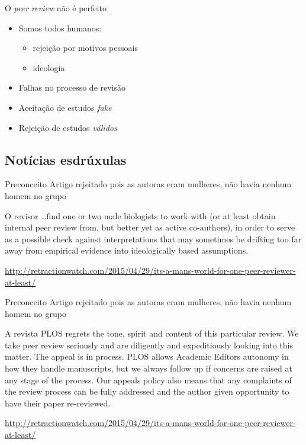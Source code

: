 \documentclass{beamer}
\begin{document}
\begin{frame}{O {\em peer review} não é perfeito}
  \begin{itemize}
    \footnotesize
  \item Somos todos humanos:
    \begin{itemize}
      \scriptsize
    \item rejeição por motivos pessoais
    \item ideologia
    \end{itemize}
    \medskip
  \item Falhas no processo de revisão
    \medskip
  \item Aceitação de estudos {\em fake}
    \medskip
  \item Rejeição de estudos {\em válidos}
  \end{itemize}
\end{frame}

\subsection{Notícias esdrúxulas}

\begin{frame}{Preconceito}
  Artigo rejeitado pois as autoras eram mulheres, não havia nenhum
  homem no grupo
    \begin{block}{O revisor}
      \scriptsize
      \ldots find one or two male biologists to work with (or at least
      obtain internal peer review from, but better yet as active
      co-authors), in order to serve as a possible check against
      interpretations that may sometimes be drifting too far away from
      empirical evidence into ideologically based assumptions.
    \end{block}

    \vfill
    \tiny
\url{http://retractionwatch.com/2015/04/29/its-a-mans-world-for-one-peer-reviewer-at-least/}
\end{frame}

\begin{frame}{Preconceito}
  Artigo rejeitado pois as autoras eram mulheres, não havia nenhum
  homem no grupo
    \begin{block}{A revista}
      \scriptsize
      PLOS regrets the tone, spirit and content of this particular
      review. We take peer review seriously and are diligently and
      expeditiously looking into this matter. The appeal is in
      process. PLOS allows Academic Editors autonomy in how they
      handle manuscripts, but we always follow up if concerns are
      raised at any stage of the process. Our appeals policy also
      means that any complaints of the review process can be fully
      addressed and the author given opportunity to have their paper
      re-reviewed.
    \end{block}

    \vfill
    \tiny
\url{http://retractionwatch.com/2015/04/29/its-a-mans-world-for-one-peer-reviewer-at-least/}
\end{frame}
\end{document}
